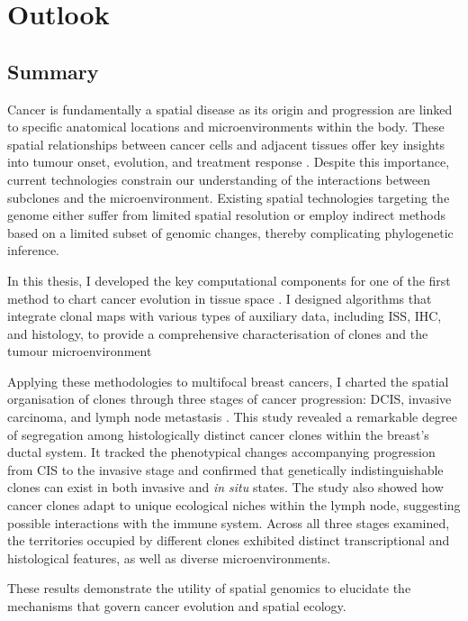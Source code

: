 \chapter{Outlook}
\label{sec:chapter-discussion}

\section{Summary}
Cancer is fundamentally a spatial disease as its origin and progression are linked to specific anatomical locations and microenvironments within the body. These spatial relationships between cancer cells and adjacent tissues offer key insights into tumour onset, evolution, and treatment response . Despite this importance, current technologies constrain our understanding of the interactions between subclones and the microenvironment. Existing spatial technologies targeting the genome either suffer from limited spatial resolution or employ indirect methods based on a limited subset of genomic changes, thereby complicating phylogenetic inference.

In this thesis, I developed the key computational components for one of the first method to chart cancer evolution in tissue space . 
I designed algorithms that integrate clonal maps with various types of auxiliary data, including \ac{ISS}, \ac{IHC}, and histology, to provide a comprehensive characterisation of clones and the tumour microenvironment 

Applying these methodologies to multifocal breast cancers, I charted the spatial organisation of clones through three stages of cancer progression: \acf{DCIS}, invasive carcinoma, and lymph node metastasis . This study revealed a remarkable degree of segregation among histologically distinct cancer clones within the breast's ductal system. It tracked the phenotypical changes accompanying progression from \ac{CIS} to the invasive stage and confirmed that genetically indistinguishable clones can exist in both invasive and \textit{in situ} states. The study also showed how cancer clones adapt to unique ecological niches within the lymph node, suggesting possible interactions with the immune system. Across all three stages examined, the territories occupied by different clones exhibited distinct transcriptional and histological features, as well as diverse microenvironments.

These results demonstrate the utility of spatial genomics to elucidate the mechanisms that govern cancer evolution and spatial ecology.

